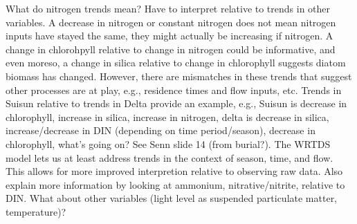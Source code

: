 \documentclass[letterpaper,12pt,oneside]{article}\usepackage[]{graphicx}\usepackage[]{color}
\begin{document}
What do nitrogen trends mean?  Have to interpret relative to trends in other variables.  A decrease in nitrogen or constant nitrogen does not mean nitrogen inputs have stayed the same, they might actually be increasing if nitrogen.  A change in chlorohpyll relative to change in nitrogen could be informative, and even moreso, a change in silica relative to change in chlorophyll suggests diatom biomass has changed.  However, there are mismatches in these trends that suggest other processes are at play, e.g., residence times and flow inputs, etc.  Trends in Suisun relative to trends in Delta provide an example, e.g., Suisun is decrease in chlorophyll, increase in silica, increase in nitrogen, delta is decrease in silica, increase/decrease in DIN (depending on time period/season), decrease in chlorophyll, what's going on? See Senn slide 14 (from burial?). The WRTDS model lets us at least address trends in the context of season, time, and flow.  This allows for more improved interpretion relative to observing raw data. Also explain more information by looking at ammonium, nitrative/nitrite, relative to DIN. What about other variables (light level as suspended particulate matter, temperature)?

\clearpage
\begin{singlespace}


\end{singlespace}
\clearpage
\end{document}
